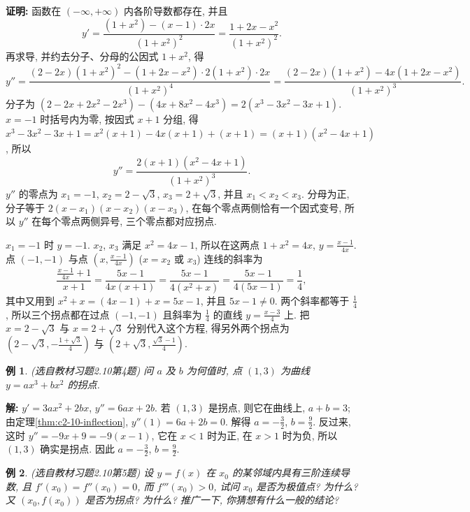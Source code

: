 \documentclass[UTF8,openany]{ctexbook}
\theoremstyle{chinesetextbook}
\newtheorem{example}{例}[section]
\newenvironment{cnproof}{\par\indent\textbf{证明:} \ignorespaces}{\par}
\newenvironment{cnsolution}{\par\indent\textbf{解:} \ignorespaces}{\par}
\begin{document}
\begin{cnproof}
函数在 $(-\infty,+\infty)$ 内各阶导数都存在, 并且
\[
y'=\frac{(1+x^2)-(x-1)\cdot2x}{(1+x^2)^2}=\frac{1+2x-x^2}{(1+x^2)^2}.
\]
再求导, 并约去分子、分母的公因式 $1+x^2$, 得
\[
y''=\frac{(2-2x)(1+x^2)^2-(1+2x-x^2)\cdot2(1+x^2)\cdot2x}{(1+x^2)^4}=\frac{(2-2x)(1+x^2)-4x(1+2x-x^2)}{(1+x^2)^3}.
\]
分子为 $(2-2x+2x^2-2x^3)-(4x+8x^2-4x^3)=2(x^3-3x^2-3x+1)$. $x=-1$ 时括号内为零, 按因式 $x+1$ 分组, 得 $x^3-3x^2-3x+1=x^2(x+1)-4x(x+1)+(x+1)=(x+1)(x^2-4x+1)$, 所以
\[
y''=\frac{2(x+1)(x^2-4x+1)}{(1+x^2)^3}.
\]
$y''$ 的零点为 $x_1=-1$, $x_2=2-\sqrt3$, $x_3=2+\sqrt3$, 并且 $x_1<x_2<x_3$. 分母为正, 分子等于 $2(x-x_1)(x-x_2)(x-x_3)$, 在每个零点两侧恰有一个因式变号, 所以 $y''$ 在每个零点两侧异号, 三个零点都对应拐点.

$x_1=-1$ 时 $y=-1$. $x_2$, $x_3$ 满足 $x^2=4x-1$, 所以在这两点 $1+x^2=4x$, $\displaystyle y=\frac{x-1}{4x}$. 点 $(-1,-1)$ 与点 $\displaystyle\left(x,\frac{x-1}{4x}\right)$ ($x=x_2$ 或 $x_3$) 连线的斜率为
\[
\frac{\frac{x-1}{4x}+1}{x+1}=\frac{5x-1}{4x(x+1)}=\frac{5x-1}{4(x^2+x)}=\frac{5x-1}{4(5x-1)}=\frac14,
\]
其中又用到 $x^2+x=(4x-1)+x=5x-1$, 并且 $5x-1\ne0$. 两个斜率都等于 $\displaystyle\frac14$, 所以三个拐点都在过点 $(-1,-1)$ 且斜率为 $\displaystyle\frac14$ 的直线 $\displaystyle y=\frac{x-3}4$ 上. 把 $x=2-\sqrt3$ 与 $x=2+\sqrt3$ 分别代入这个方程, 得另外两个拐点为 $\displaystyle\left(2-\sqrt3,-\frac{1+\sqrt3}4\right)$ 与 $\displaystyle\left(2+\sqrt3,\frac{\sqrt3-1}4\right)$.
\end{cnproof}
\begin{example}\label{ex:c2-h10-4}
\textnormal{(选自教材习题2.10第4题)} 问 $a$ 及 $b$ 为何值时, 点 $(1,3)$ 为曲线 $y=ax^3+bx^2$ 的拐点.
\end{example}
\begin{cnsolution}
$y'=3ax^2+2bx$, $y''=6ax+2b$. 若 $(1,3)$ 是拐点, 则它在曲线上, $a+b=3$; 由定理\ref{thm:c2-10-inflection}, $y''(1)=6a+2b=0$. 解得 $\displaystyle a=-\frac32$, $\displaystyle b=\frac92$. 反过来, 这时 $y''=-9x+9=-9(x-1)$, 它在 $x<1$ 时为正, 在 $x>1$ 时为负, 所以 $(1,3)$ 确实是拐点. 因此 $\displaystyle a=-\frac32$, $\displaystyle b=\frac92$.
\end{cnsolution}
\begin{example}\label{ex:c2-h10-5}
\textnormal{(选自教材习题2.10第5题)} 设 $y=f(x)$ 在 $x_0$ 的某邻域内具有三阶连续导数, 且 $f'(x_0)=f''(x_0)=0$, 而 $f'''(x_0)>0$, 试问 $x_0$ 是否为极值点? 为什么? 又 $(x_0,f(x_0))$ 是否为拐点? 为什么? 推广一下, 你猜想有什么一般的结论?
\end{example}
\end{document}
